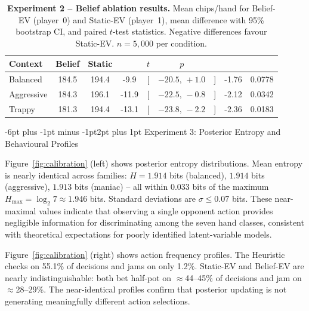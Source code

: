 \documentclass[12pt]{article}
\makeatletter
\renewcommand\subsection{\@startsection{subsection}{2}{\z@}%
  {-6pt plus -1pt minus -1pt}{2pt plus 1pt}%
  {\normalfont\normalsize\bfseries}}
\makeatother
\begin{document}
\begin{table}[ht]
  \centering
  \small
  \caption{%
    \textbf{Experiment 2 -- Belief ablation results.}
    Mean chips/hand for Belief-EV (player~0) and Static-EV
    (player~1), mean difference with 95\% bootstrap CI, and
    paired $t$-test statistics.
    Negative differences favour Static-EV.
    $n=5{,}000$ per condition.
  }
  \label{tab:ablation_results}
  \begin{tabularx}{\textwidth}{l
    S[table-format=3.1]
    S[table-format=3.1]
    S[table-format=3.1]
    @{\,}c@{\,}
    S[table-format=3.1]
    S[table-format=-1.2]
    S[table-format=1.4]}
    \toprule
    Context &
    {Belief} & {Static} & {} &
    {$t$} & {$p$} \\
    \midrule
    Balanced    & 184.5 & 194.4 & -9.9  & [&$-20.5,\, +1.0$&] & -1.76 & 0.0778 \\
    Aggressive  & 184.3 & 196.1 & -11.9 & [&$-22.5,\, -0.8$&] & -2.12 & 0.0342 \\
    Trappy      & 181.3 & 194.4 & -13.1 & [&$-23.8,\, -2.2$&] & -2.36 & 0.0183 \\
    \bottomrule
  \end{tabularx}
\end{table}

\FloatBarrier

\subsection{Experiment 3: Posterior Entropy and Behavioural Profiles}

Figure~\ref{fig:calibration} (left) shows posterior entropy
distributions.
Mean entropy is nearly identical across families:
$H=1.914$ bits (balanced), $1.914$ bits (aggressive), $1.913$ bits
(maniac) -- all within $0.033$ bits of the maximum
$H_{\max}=\log_2 7 \approx 1.946$ bits.
Standard deviations are $\sigma \leq 0.07$ bits.
These near-maximal values indicate that observing a single opponent
action provides negligible information for discriminating among the
seven hand classes, consistent with theoretical expectations for
poorly identified latent-variable models\cite{gal2016dropout,
murphy2012ml}.

Figure~\ref{fig:calibration} (right) shows action frequency profiles.
The Heuristic checks on 55.1\% of decisions and jams on only 1.2\%.
Static-EV and Belief-EV are nearly indistinguishable: both bet
half-pot on $\approx$44--45\% of decisions and jam on
$\approx$28--29\%.
The near-identical profiles confirm that posterior updating is not
generating meaningfully different action selections.
\end{document}
